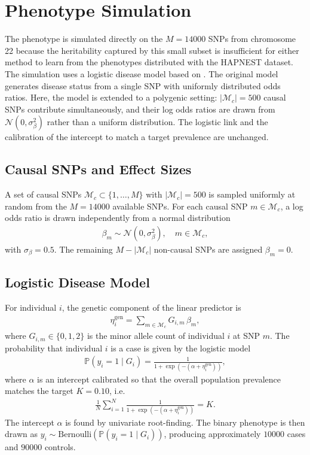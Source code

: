 \section{Phenotype Simulation}
\label{sec:app_pheno_sim}
The phenotype is simulated directly on the $M = 14000$ SNPs from chromosome
22 because the heritability captured by this small subset is insufficient
for either method to learn from the phenotypes distributed with the HAPNEST
dataset. The simulation uses a logistic disease model based on
\citet{Majumdar2018}. The original model generates disease status from a
single SNP with uniformly distributed odds ratios. Here, the model is
extended to a polygenic setting: $|\mathcal{M}_c| = 500$ causal SNPs
contribute simultaneously, and their log odds ratios are drawn from
$\mathcal{N}(0, \sigma_\beta^2)$ rather than a uniform distribution. The
logistic link and the calibration of the intercept to match a target
prevalence are unchanged.

\subsection{Causal SNPs and Effect Sizes}

A set of causal SNPs $\mathcal{M}_c \subset \{1, \dots, M\}$ with $|\mathcal{M}_c| = 500$ is sampled uniformly at random from the $M = 14000$ available SNPs. For each causal SNP $m \in \mathcal{M}_c$, a log odds ratio is drawn independently from a normal distribution
\begin{align*}
    \beta_m \sim \mathcal{N}(0, \sigma_\beta^2), \quad m \in \mathcal{M}_c,
\end{align*}
with $\sigma_\beta = 0.5$. The remaining $M - |\mathcal{M}_c|$ non-causal SNPs are assigned $\beta_m = 0$.

\subsection{Logistic Disease Model}

For individual $i$, the genetic component of the linear predictor is
\begin{align*}
    \eta_i^{\text{gen}} = \sum_{m \in \mathcal{M}_c} G_{i,m}\,\beta_m,
\end{align*}
where $G_{i,m} \in \{0, 1, 2\}$ is the minor allele count of individual $i$ at SNP $m$. The probability that individual $i$ is a case is given by the logistic model
\begin{align*}
    \mathbb{P}(y_i = 1 \mid G_i) = \frac{1}{1 + \exp\left(-(\alpha + \eta_i^{\text{gen}})\right)},
\end{align*}
where $\alpha$ is an intercept calibrated so that the overall population prevalence matches the target $K = 0.10$, i.e.\
\begin{align*}
    \frac{1}{N}\sum_{i=1}^{N} \frac{1}{1 + \exp(-(\alpha + \eta_i^{\text{gen}}))} = K.
\end{align*}
The intercept $\alpha$ is found by univariate root-finding. The binary phenotype is then drawn as $y_i \sim \text{Bernoulli}\!\left(\mathbb{P}(y_i = 1 \mid G_i)\right)$, producing approximately $10000$ cases and $90000$ controls.

